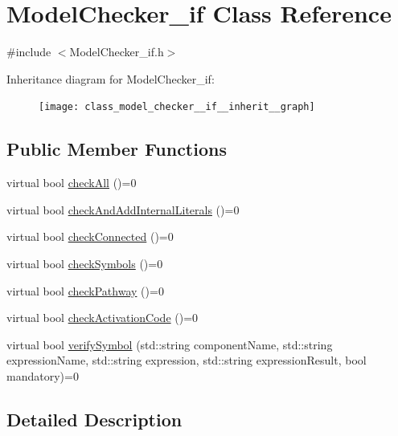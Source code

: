 \hypertarget{class_model_checker__if}{\section{Model\-Checker\-\_\-if Class Reference}
\label{class_model_checker__if}
}


{\ttfamily \#include $<$Model\-Checker\-\_\-if.\-h$>$}



Inheritance diagram for Model\-Checker\-\_\-if\-:\nopagebreak
\begin{figure}[H]
\begin{center}
\leavevmode
\texttt{[image: class\_model\_checker\_\_if\_\_inherit\_\_graph]}
\end{center}
\end{figure}
\subsection*{Public Member Functions}
\begin{DoxyCompactItemize}
\item 
virtual bool \hyperlink{class_model_checker__if_a83bc988696c49a17e0e7668e24743251}{check\-All} ()=0
\item 
virtual bool \hyperlink{class_model_checker__if_a22989b69e688a96fd200e740d33181a5}{check\-And\-Add\-Internal\-Literals} ()=0
\item 
virtual bool \hyperlink{class_model_checker__if_a0d527f054d705b5527bb6521e51c34a7}{check\-Connected} ()=0
\item 
virtual bool \hyperlink{class_model_checker__if_a92ab650708e675a1818b41fe4eb93a59}{check\-Symbols} ()=0
\item 
virtual bool \hyperlink{class_model_checker__if_a1d1e71dcfd02500cf2a844a62395ac36}{check\-Pathway} ()=0
\item 
virtual bool \hyperlink{class_model_checker__if_af5be5d01ea1c549eee6b94907f5ccb74}{check\-Activation\-Code} ()=0
\item 
virtual bool \hyperlink{class_model_checker__if_a36eada12fe9753f5c89099c572e27426}{verify\-Symbol} (std\-::string component\-Name, std\-::string expression\-Name, std\-::string expression, std\-::string expression\-Result, bool mandatory)=0
\end{DoxyCompactItemize}


\subsection{Detailed Description}


